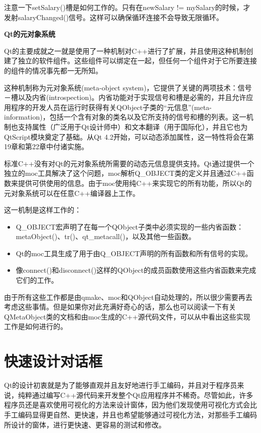 \documentclass[11pt,oneside]{book}
\begin{document}
\begin{common-format}
注意一下setSalary()槽是如何工作的。只有在newSalary != mySalary的时候，才发射salaryChanged()信号。这样可以确保循环连接不会导致无限循环。

\begin{framed}
\vspace{-\parskip}
\begin{center}
\textbf{Qt的元对象系统}
\end{center}

Qt的主要成就之一就是使用了一种机制对C++进行了扩展，并且使用这种机制创建了独立的软件组件。这些组件可以绑定在一起，但任何一个组件对于它所要连接的组件的情况事先都一无所知。

这种机制称为元对象系统(meta-object system)，它提供了关键的两项技术：信号－槽以及内省(introspection)。内省功能对于实现信号和槽是必需的，并且允许应用程序的开发人员在运行时获得有关QObject子类的“元信息”(meta-information)，包括一个含有对象的类名以及它所支持的信号和槽的列表。这一机制也支持属性（广泛用于Qt设计师中）和文本翻译（用于国际化），并且它也为QtScript模块奠定了基础。从Qt 4.2开始，可以动态添加属性，这一特性将会在第19章和第22章中付诸实施。

标准C++没有对Qt的元对象系统所需要的动态元信息提供支持。Qt通过提供一个独立的moc工具解决了这个问题，moc解析Q\_{}OBJECT类的定义并且通过C++函数来提供可供使用的信息。由于moc使用纯C++来实现它的所有功能，所以Qt的元对象系统可以在任意C++编译器上工作。

这一机制是这样工作的：
\begin{itemize}
\item Q\_{}OBJECT宏声明了在每一个QObject子类中必须实现的一些内省函数：metaObject()、tr()、qt\_{}metacall()，以及其他一些函数。
\item Qt的moc工具生成了用于由Q\_{}OBJECT声明的所有函数和所有信号的实现。
\item 像connect()和disconnect()这样的QObject的成员函数使用这些内省函数来完成它们的工作。
\end{itemize}

由于所有这些工作都是由qmake、moc和QObject自动处理的，所以很少需要再去考虑这些事情。但是如果你对此充满好奇心的话，那么也可以阅读一下有关QMetaObject类的文档和由moc生成的C++源代码文件，可以从中看出这些实现工作是如何进行的。
\end{framed}


\section{快速设计对话框}
Qt的设计初衷就是为了能够直观并且友好地进行手工编码，并且对于程序员来说，纯粹通过编写C++源代码来开发整个Qt应用程序并不稀奇。尽管如此，许多程序员还是喜欢使用可视化的方法来设计窗体，因为他们发现使用可视化方式会比手工编码显得更自然、更快速，并且也希望能够通过可视化方法，对那些手工编码所设计的窗体，进行更快速、更容易的测试和修改。


\end{common-format}
\end{document}
